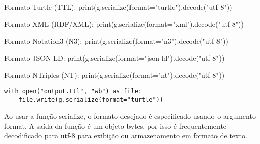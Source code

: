 Formato Turtle (TTL):
print(g.serialize(format="turtle").decode("utf-8"))

Formato XML (RDF/XML):
print(g.serialize(format="xml").decode("utf-8"))

Formato Notation3 (N3):
print(g.serialize(format="n3").decode("utf-8"))

Formato JSON-LD:
print(g.serialize(format="json-ld").decode("utf-8"))

Formato NTriples (NT):
print(g.serialize(format="nt").decode("utf-8"))

\begin{verbatim}
with open("output.ttl", "wb") as file:
    file.write(g.serialize(format="turtle"))
\end{verbatim}

Ao usar a função serialize, o formato desejado é especificado usando o argumento format. A saída da função é um objeto bytes, por isso é frequentemente decodificado para utf-8 para exibição ou armazenamento em formato de texto.
